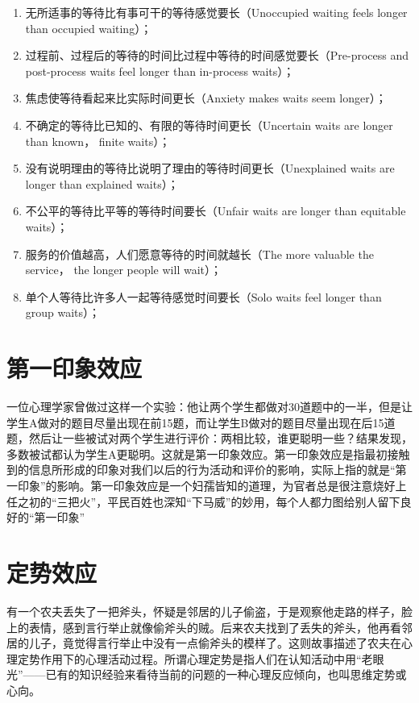 \documentclass[11pt]{ctexart}
\begin{document}
\begin{enumerate}
\item 无所适事的等待比有事可干的等待感觉要长（Unoccupied waiting feels longer than occupied waiting）；
\item 过程前、过程后的等待的时间比过程中等待的时间感觉要长（Pre-process and post-process waits feel longer than in-process waits）；
\item 焦虑使等待看起来比实际时间更长（Anxiety makes waits seem longer）；
\item 不确定的等待比已知的、有限的等待时间更长（Uncertain waits are longer than known， finite waits）；
\item 没有说明理由的等待比说明了理由的等待时间更长（Unexplained waits are longer than explained waits）；
\item 不公平的等待比平等的等待时间要长（Unfair waits are longer than equitable waits）；
\item 服务的价值越高，人们愿意等待的时间就越长（The more valuable the service， the longer people will wait）；
\item 单个人等待比许多人一起等待感觉时间要长（Solo waits feel longer than group waits）；
\end{enumerate}
\section{第一印象效应}
\label{sec-31}


一位心理学家曾做过这样一个实验：他让两个学生都做对30道题中的一半，但是让学生A做对的题目尽量出现在前15题，而让学生B做对的题目尽量出现在后15道题，然后让一些被试对两个学生进行评价：两相比较，谁更聪明一些？结果发现，多数被试都认为学生A更聪明。这就是第一印象效应。第一印象效应是指最初接触到的信息所形成的印象对我们以后的行为活动和评价的影响，实际上指的就是“第一印象”的影响。第一印象效应是一个妇孺皆知的道理，为官者总是很注意烧好上任之初的“三把火”，平民百姓也深知“下马威”的妙用，每个人都力图给别人留下良好的“第一印象”
\section{定势效应}
\label{sec-32}


有一个农夫丢失了一把斧头，怀疑是邻居的儿子偷盗，于是观察他走路的样子，脸上的表情，感到言行举止就像偷斧头的贼。后来农夫找到了丢失的斧头，他再看邻居的儿子，竟觉得言行举止中没有一点偷斧头的模样了。这则故事描述了农夫在心理定势作用下的心理活动过程。所谓心理定势是指人们在认知活动中用“老眼光”——已有的知识经验来看待当前的问题的一种心理反应倾向，也叫思维定势或心向。
\end{document}
